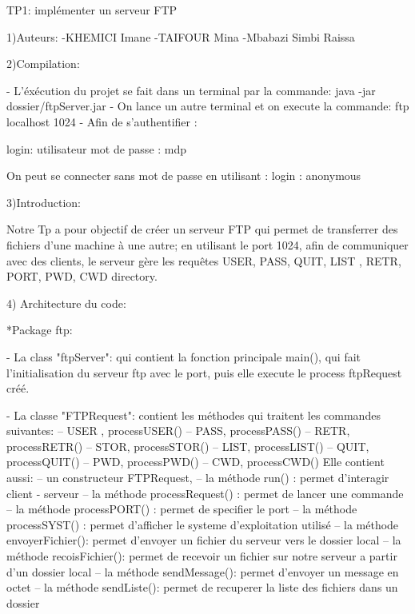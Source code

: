 				
								TP1: implémenter un serveur FTP

	1)Auteurs:
		-KHEMICI Imane
		-TAIFOUR Mina
		-Mbabazi Simbi Raissa

	2)Compilation:
               
		- L'éxécution du projet se fait dans un terminal par la commande: java -jar dossier/ftpServer.jar
		- On lance un autre terminal et on execute la commande: ftp localhost 1024
		- Afin de s'authentifier : 

                login: utilisateur
                mot de passe : mdp

                On peut se connecter sans mot de passe en utilisant :
                login : anonymous
		
	3)Introduction: 
			
		Notre Tp a pour objectif de créer un serveur FTP qui permet de transferrer des fichiers d'une machine à une autre; en utilisant le port 1024, afin de communiquer avec des clients,
		le serveur gère les requêtes USER, PASS, QUIT, LIST , RETR, PORT, PWD, CWD directory.
	
	4) Architecture du code: 

       *Package ftp: 

		- La class "ftpServer": qui contient la fonction principale main(), qui fait l'initialisation du serveur ftp avec le port, puis elle execute le process
		ftpRequest créé.
		
		- La classe "FTPRequest": contient les méthodes qui traitent les commandes suivantes:
			-- USER , processUSER()
			-- PASS, processPASS()
			-- RETR, processRETR()
			-- STOR, processSTOR()
			-- LIST, processLIST()
			-- QUIT, processQUIT()
			-- PWD,  processPWD()
                        -- CWD,  processCWD() 
                        Elle contient aussi: 
			-- un constructeur FTPRequest,  
			-- la méthode run() : permet d'interagir client - serveur
			-- la méthode processRequest() : permet de lancer une commande
			-- la méthode processPORT() : permet de specifier le port 
			-- la méthode processSYST() : permet d'afficher le systeme d'exploitation utilisé
                        -- la méthode envoyerFichier(): permet d'envoyer un fichier du serveur vers le dossier local
                        -- la méthode recoisFichier(): permet de recevoir un fichier sur notre serveur a partir d'un dossier local
                        -- la méthode sendMessage(): permet d'envoyer un message en octet
                        -- la méthode sendListe(): permet de recuperer la liste des fichiers dans un dossier 


